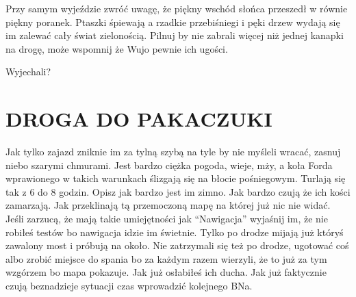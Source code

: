 \documentclass[ms,a4paper]{memoir}
\newcommand{\RED}[1]{\textcolor{red!50!black}{\MakeUppercase{#1}}}
\begin{document}
Przy samym wyjeździe zwróć uwagę, że piękny wschód słońca przeszedł w równie piękny poranek.
Ptaszki śpiewają a rzadkie przebiśniegi i pęki drzew wydają się im zalewać cały świat zielonością.
Pilnuj by nie zabrali więcej niż jednej kanapki na drogę, może wspomnij że Wujo pewnie ich ugości.

Wyjechali?
\chapter{\RED{Droga do Pakaczuki}}

Jak tylko zajazd zniknie im za tylną szybą na tyle by nie myśleli wracać, zasnuj niebo szarymi chmurami.
Jest bardzo ciężka pogoda, wieje, mży, a koła Forda wprawionego w takich warunkach ślizgają się na błocie pośniegowym.
Turlają się tak z 6 do 8 godzin.
Opisz jak bardzo jest im zimno.
Jak bardzo czują że ich kości zamarzają.
Jak przeklinają tą przemoczoną mapę na której już nic nie widać.
Jeśli zarzucą, że mają takie umiejętności jak ``Nawigacja'' wyjaśnij im, że nie robiłeś testów bo nawigacja idzie im świetnie.
Tylko po drodze mijają już któryś zawalony most i próbują na około.
Nie zatrzymali się też po drodze, ugotować coś albo zrobić miejsce do spania bo za każdym razem wierzyli, że to już za tym wzgórzem bo mapa pokazuje.
Jak już osłabiłeś ich ducha.
Jak już faktycznie czują beznadzieje sytuacji czas wprowadzić kolejnego BNa.
\end{document}
